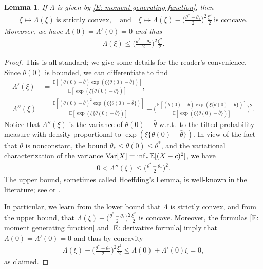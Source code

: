 \documentclass[12pt]{amsart}
\newtheorem{lemma}{Lemma}
\newcommand{\E}{\mathbb{E}}
\begin{document}
\begin{lemma}\label{lem:properties-lambda}
	If $ \Lambda $ is given by \eqref{E: moment generating function}, then
	\begin{align*}
		\xi \mapsto \Lambda ( \xi ) ~ \text{is strictly convex},
		\quad \text{and} \quad
		\xi \mapsto \Lambda ( \xi ) - \Big( \frac{ \theta^* - \theta_* }{ 2 } \Big)^2 \frac{ \xi^2 }{ 2 } ~ \text{is concave}.
	\end{align*}
	Moreover, we have $ \Lambda ( 0 ) = \Lambda ' ( 0 ) = 0 $ and thus
	\begin{align*}
		\Lambda ( \xi ) \leq \Big( \frac{ \theta^* - \theta_* }{ 2 } \Big)^2 \frac{ \xi^2 }{ 2 } .
	\end{align*}
\end{lemma}

\begin{proof}  This is all standard; we give some details for the reader's convenience.  Since $\theta(0)$ is bounded, we can differentiate to find
	\begin{align}
		\Lambda ' (\xi) &= \frac{ \mathbb{E} [ ( \theta(0) - \bar{\theta}  ) \exp ( \xi \{ \theta(0) - \bar{\theta} \} ) ] }{ \mathbb{E} [ \exp ( \xi \{ \theta(0) - \bar{\theta} \} ) ] } , \label{E: derivative formula} \\
		\Lambda '' (\xi) &= \frac{ \mathbb{E} [ ( \theta(0) - \bar{\theta}  )^2 \exp ( \xi \{ \theta(0) - \bar{\theta} \} ) ] }{ \mathbb{E} [ \exp ( \xi \{ \theta(0) - \bar{\theta} \} ) ] } - \Big( \frac{ \mathbb{E} [ ( \theta(0) - \bar{\theta}  ) \exp ( \xi \{ \theta(0) - \bar{\theta} \} ) ]  }{ \mathbb{E} [ \exp ( \xi \{ \theta(0) - \bar{\theta} \} ) ] } \Big)^2 . \nonumber
	\end{align}
	Notice that $ \Lambda '' ( \xi ) $ is the variance of $ \theta(0) - \bar\theta $ w.r.t.~to the tilted probability measure with density proportional to $ \exp ( \xi \{ \theta(0) - \bar{\theta} \} ) $. In view of the fact that $\theta$ is nonconstant, the bound $ \theta_* \leq \theta( 0 ) \leq \theta^* $, and the variational characterization of the variance $ { \rm Var } [ X ] = \inf_{ c } \E [ ( X - c )^2 ] $, we have	
	\begin{align*}
		0 < \Lambda '' ( \xi ) \leq \Big( \frac{ \theta^* - \theta_* }{ 2 } \Big)^2 .
	\end{align*}
The upper bound, sometimes called Hoeffding's Lemma, is well-known in the literature; see \cite[Lemma 2.2]{boucheron_lugosi_massart} or \cite[Section 2.4.1]{dembo_zeitouni}.

	In particular, we learn from the lower bound that $ \Lambda $ is strictly convex, and from the upper bound, that $ \Lambda ( \xi ) -  \big( \frac{ \theta^* - \theta_* }{ 2 } \big)^2 \frac{ \xi^2 }{ 2 } $ is concave. Moreover, the formulas \eqref{E: moment generating function} and \eqref{E: derivative formula} imply that $ \Lambda ( 0 ) = \Lambda ' ( 0 ) = 0  $ and thus by concavity
	\begin{align*}
		\Lambda ( \xi ) - \Big( \frac{ \theta^* - \theta_* }{ 2 } \Big)^2 \frac{ \xi^2 }{ 2 } \leq \Lambda ( 0 ) + \Lambda ' ( 0 ) \xi = 0 ,
	\end{align*}
	as claimed.
\end{proof}
\end{document}
